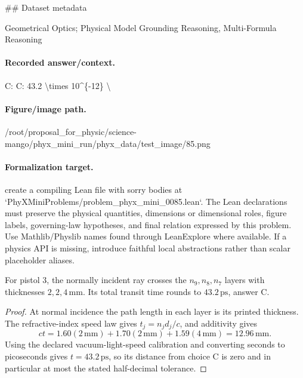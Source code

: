 \#\# Dataset metadata

Geometrical Optics; Physical Model Grounding Reasoning, Multi-Formula Reasoning

\paragraph{Recorded answer/context.}
C: C: 43.2 \textbackslash{}times 10\textasciicircum{}\{-12\} \textbackslash{}

\paragraph{Figure/image path.}
/root/proposal\_for\_physic/science-mango/phyx\_mini\_run/phyx\_data/test\_image/85.png

\paragraph{Formalization target.}
create a compiling Lean file with sorry bodies at `PhyXMiniProblems/problem\_phyx\_mini\_0085.lean`. The Lean declarations must preserve the physical quantities, dimensions or dimensional roles, figure labels, governing-law hypotheses, and final relation expressed by this problem.
Use Mathlib/Physlib names found through LeanExplore where available. If a physics API is missing, introduce faithful local abstractions rather than scalar placeholder aliases.

\begin{theorem}
\label{thm:physics:phyx_mini_0085:target}
For pistol 3, the normally incident ray crosses the \(n_9,n_8,n_7\) layers
with thicknesses \(2,2,4\,\mathrm{mm}\).  Its total transit time rounds to
\(43.2\,\mathrm{ps}\), answer C.
\end{theorem}
\begin{proof}
At normal incidence the path length in each layer is its printed thickness.
The refractive-index speed law gives \(t_j=n_jd_j/c\), and additivity gives
\[
 ct=1.60(2\,\mathrm{mm})+1.70(2\,\mathrm{mm})
       +1.59(4\,\mathrm{mm})=12.96\,\mathrm{mm}.
\]
Using the declared vacuum-light-speed calibration and converting seconds to
picoseconds gives \(t=43.2\,\mathrm{ps}\), so its distance from choice C is
zero and in particular at most the stated half-decimal tolerance.
\end{proof}

